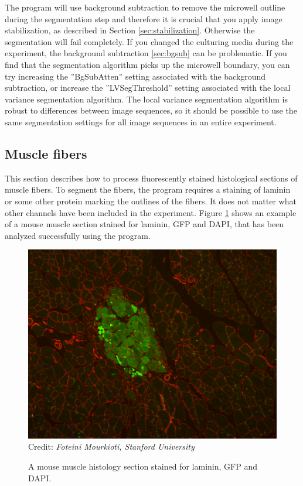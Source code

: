 \documentclass[a4paper, oneside, onecolumn, 11pt]{article}
\newcommand{\setting}[1]{''#1''}
\newcommand{\credit}[1]{\raggedleft \scriptsize Credit:\emph{ #1}}
\begin{document}
The program will use background subtraction to remove the microwell outline during the segmentation step and therefore it is crucial that you apply image stabilization, as described in Section \ref{sec:stabilization}. Otherwise the segmentation will fail completely. If you changed the culturing media during the experiment, the background subtraction \ref{sec:bgsub} can be problematic. If you find that the segmentation algorithm picks up the microwell boundary, you can try increasing the \setting{BgSubAtten} setting associated with the background subtraction, or increase the \setting{LVSegThreshold} setting associated with the local variance segmentation algorithm. The local variance segmentation algorithm is robust to differences between image sequences, so it should be possible to use the same segmentation settings for all image sequences in an entire experiment.

\subsection{Muscle fibers}
\label{sec:fibers}
This section describes how to process fluorescently stained histological sections of muscle fibers. To segment the fibers, the program requires a staining of laminin or some other protein marking the outlines of the fibers. It does not matter what other channels have been included in the experiment. Figure \ref{fig:fibers} shows an example of a mouse muscle section stained for laminin, GFP and DAPI, that has been analyzed successfully using the program.

\begin{figure}[!htb]
\begin{center}
\includegraphics[width = \columnwidth]{figures/fibers}
\credit{Foteini Mourkioti, Stanford University}
\caption{A mouse muscle histology section stained for laminin, GFP and DAPI.}
\label{fig:fibers}
\end{center}
\end{figure}
\end{document}
